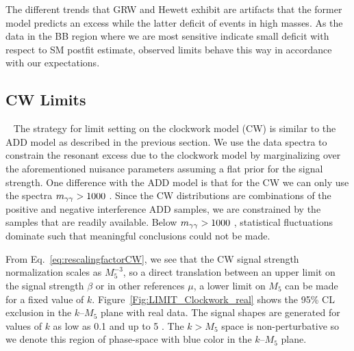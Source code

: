The different trends that GRW and Hewett exhibit are artifacts that the former model predicts an excess while the latter deficit of events in high masses. As the data in the BB region where we are most sensitive indicate small deficit with respect to SM postfit estimate, observed limits behave this way in accordance with our expectations. 



\subsection{CW Limits}~\label{sec:CWlimits}
The strategy for limit setting on the clockwork model (CW) is similar to the ADD model as described in the previous section. We use the data \mgg spectra to constrain the resonant excess due to the clockwork model by marginalizing over the aforementioned nuisance parameters assuming a flat prior for the signal strength. One difference with the ADD model is that for the CW we can only use the spectra $m_{\gamma\gamma}>1000$ \GeV. Since the CW distributions are combinations of the positive and negative interference ADD samples, we are constrained by the samples that are readily available. Below $m_{\gamma\gamma}>1000$ \GeV, statistical fluctuations dominate such that meaningful conclusions could not be made. 

From Eq.~\ref{eq:rescalingfactorCW}, we see that the CW signal strength normalization scales as $M_5^{-3}$, so a direct translation between an upper limit on the signal strength $\beta$ or in other references $\mu$, a lower limit on $M_5$ can be made for a fixed value of $k$. Figure~\ref{Fig:LIMIT_Clockwork_real} shows the 95\% CL exclusion in the $k$--$M_5$ plane with real data.
The signal shapes are generated for values of $k$ as low as 0.1 \GeV and up to 5 \TeV. The $k>M_5$ space is non-perturbative so we denote this region of phase-space with blue color in the $k$--$M_5$ plane.


